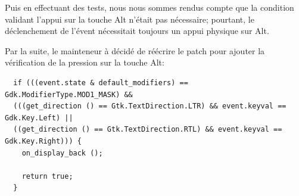 \documentclass[12pt]{report}
\begin{document}
Puis en effectuant des tests, nous nous sommes rendus compte que la
condition validant l'appui sur la touche Alt n'était pas nécessaire;
pourtant, le déclenchement de l'évent nécessitait toujours un appui
physique sur Alt.

Par la suite, le mainteneur à décidé de réécrire le patch pour ajouter
la vérification de la pression sur la touche Alt:

\begin{verbatim}
  if (((event.state & default_modifiers) == Gdk.ModifierType.MOD1_MASK) &&
  (((get_direction () == Gtk.TextDirection.LTR) && event.keyval == Gdk.Key.Left) ||
  ((get_direction () == Gtk.TextDirection.RTL) && event.keyval == Gdk.Key.Right))) {
    on_display_back ();

    return true;
  }
\end{verbatim}







\end{document}
